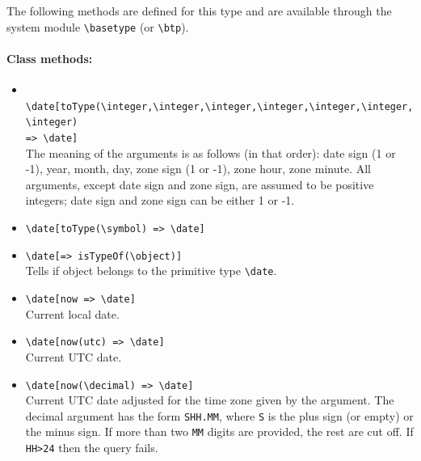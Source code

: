 \documentclass[11pt]{article}
\newcommand{\bs}{\textbackslash}
\begin{document}
The following methods are defined for this type and are available through
the system module {\tt \bs{}basetype} (or \texttt{\bs{}btp}).
\paragraph{Class methods:}
\begin{itemize}
\item {\tt
    \bs{}date[toType(\bs{}integer,\bs{}integer,\bs{}integer,\bs{}integer,\bs{}integer,\bs{}integer,\bs{}integer)
    \\
    => \bs{}date]}
  \\
  The meaning of the arguments is as follows (in that order): date sign (1
  or -1), year, month, day, zone sign (1 or -1), zone hour, zone minute.
  All arguments, except date sign and zone sign, are assumed to be positive
  integers; date sign and zone sign can be either 1 or -1.
    \item {\tt \bs{}date[toType(\bs{}symbol) => \bs{}date]}
    \item {\tt \bs{}date[=> isTypeOf(\bs{}object)]}\\
      Tells if object belongs to the primitive type {\tt \bs{}date}. 
\item \texttt{\bs{}date[now => \bs{}date]} \\
  Current local date.
\item \texttt{\bs{}date[now(utc) => \bs{}date]} \\
  Current UTC date.
\item \texttt{\bs{}date[now(\bs{}decimal) => \bs{}date]} \\
  Current UTC date adjusted for the time zone given by the argument.
  The decimal argument has the form \texttt{SHH.MM}, where \texttt{S} is
  the plus sign (or empty) or the minus sign.
  If more than two \texttt{MM} digits are provided, the rest are cut off.
  If \texttt{HH>24} then the query fails. 
\end{itemize}
\end{document}
